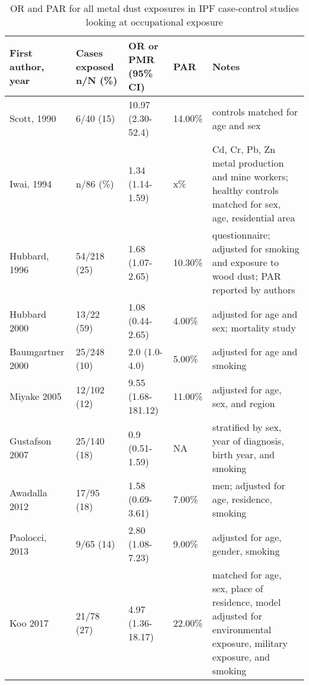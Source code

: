 \documentclass[a4
er,12pt]{article}
\begin{document}
\begin{table}   
     \begin{tabular}{p{3.5cm}p{3cm}p{2cm}p{2cm}p{3.5cm}}
     \textbf{First author, year} & \textbf{Cases exposed n/N (\%)} & \textbf{OR or PMR (95\% CI)} & \textbf{PAR} &   \textbf{Notes} \\
     \midrule
  Scott, 1990 &  6/40 (15) &  10.97 (2.30-52.4) &  14.00\% &  controls matched for age and sex \\
 Iwai, 1994 &  n/86 (\%) &  1.34 (1.14-1.59) &  x\% &  Cd, Cr, Pb, Zn metal production and mine workers; healthy controls matched for sex, age, residential area \\
 Hubbard, 1996 &  54/218 (25) &  1.68 (1.07-2.65) &  10.30\% &  questionnaire; adjusted for smoking and exposure to wood dust; PAR reported by authors \\
 Hubbard 2000 &  13/22 (59) &  1.08 (0.44-2.65) &  4.00\% &  adjusted for age and sex; mortality study \\
 Baumgartner 2000 &  25/248 (10) &  2.0 (1.0-4.0) &  5.00\% &  adjusted for age and smoking \\
 Miyake 2005 &  12/102 (12) &  9.55 (1.68-181.12) &  11.00\% &  adjusted for age, sex, and region \\
 Gustafson 2007 &  25/140 (18) &  0.9 (0.51-1.59) &  NA &  stratified by sex, year of diagnosis, birth year, and smoking \\
 Awadalla 2012 &  17/95 (18) &  1.58 (0.69-3.61) &  7.00\% &  men; adjusted for age, residence, smoking \\
 Paolocci, 2013 &  9/65 (14) &  2.80 (1.08-7.23) &  9.00\% &  adjusted for age, gender, smoking \\
 Koo 2017 &  21/78 (27) &  4.97 (1.36-18.17) &  22.00\% &  matched for age, sex, place of residence, model adjusted for environmental exposure, military exposure, and smoking \\
     \bottomrule
     \end{tabular}                 
     \caption{OR and PAR for all metal dust exposures in IPF case-control studies looking at occupational exposure}
     \label{table:ipfmetaldust}
 \end{table}
\end{document}
